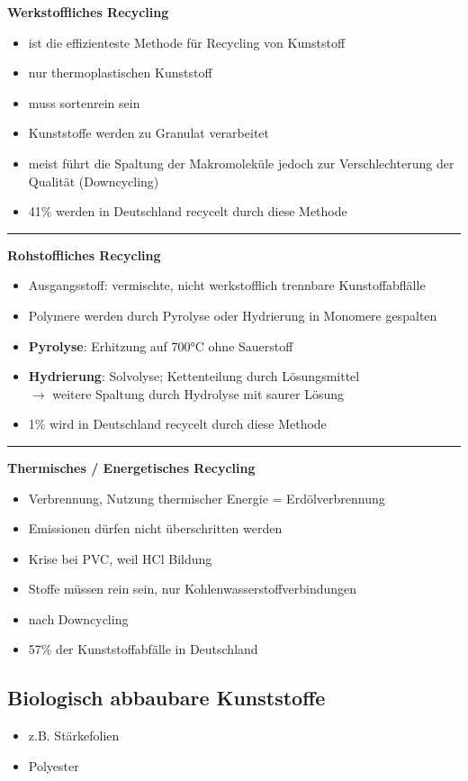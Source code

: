 \begin{multicols}{2}

    \textbf{Werkstoffliches Recycling} 
    \begin{itemize}
        \item ist die effizienteste Methode für Recycling von Kunststoff
        \item nur thermoplastischen Kunststoff
        \item muss sortenrein sein
        \item Kunststoffe werden zu Granulat verarbeitet
        \item meist führt die Spaltung der Makromoleküle jedoch zur Verschlechterung der Qualität (Downcycling)
        \item 41\% werden in Deutschland recycelt durch diese Methode
    \end{itemize}

\end{multicols}
\hrule
\vspace{0.3cm}
\begin{multicols}{2}

    \textbf{Rohstoffliches Recycling} 
    \begin{itemize}
        \item Ausgangsstoff: vermischte, nicht werkstofflich trennbare Kunstoffabflälle
        \item Polymere werden durch Pyrolyse oder Hydrierung in Monomere gespalten
        \item \textbf{Pyrolyse}: Erhitzung auf 700°C ohne Sauerstoff
        \item \textbf{Hydrierung}: Solvolyse; Kettenteilung durch Lösungsmittel \\
            $\rightarrow$ weitere Spaltung durch Hydrolyse mit saurer Lösung
        \item 1\% wird in Deutschland recycelt durch diese Methode
    \end{itemize}

\end{multicols}
\hrule
\vspace{0.3cm}
\begin{multicols}{2}

    \textbf{Thermisches / Energetisches Recycling}
    \begin{itemize}
        \item Verbrennung, Nutzung thermischer Energie = Erdölverbrennung
        \item Emissionen dürfen nicht überschritten werden
        \item Krise bei PVC, weil HCl Bildung
        \item Stoffe müssen rein sein, nur Kohlenwasserstoffverbindungen
        \item nach Downcycling
        \item 57\% der Kunststoffabfälle in Deutschland
    \end{itemize}

\end{multicols}

\subsection{Biologisch abbaubare Kunststoffe}
\begin{itemize}
    \item z.B. Stärkefolien
    \item Polyester
\end{itemize}


